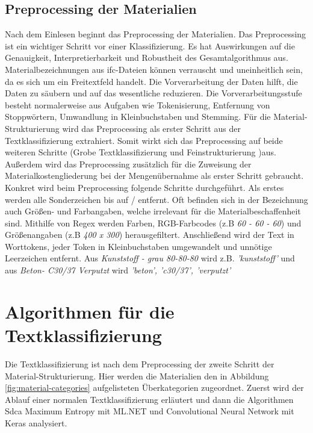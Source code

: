 \subsection{Preprocessing der Materialien}
\label{c:conception:architecture:preprocessing}
Nach dem Einlesen beginnt das Preprocessing der Materialien.
Das Preprocessing ist ein wichtiger Schritt vor einer Klassifizierung. Es hat Auswirkungen auf die Genauigkeit, Interpretierbarkeit und Robustheit des Gesamtalgorithmus aus. \citep{Zelaya_2019} Materialbezeichnungen aus \ac{ifc}-Dateien können verrauscht und uneinheitlich sein, da es sich um ein Freitextfeld handelt. Die Vorverarbeitung der Daten hilft, die Daten zu säubern und auf das wesentliche reduzieren. \citep{Priyanga_2016}
Die Vorverarbeitungsstufe besteht normalerweise aus Aufgaben wie Tokenisierung, Entfernung von Stoppwörtern, Umwandlung in Kleinbuchstaben und Stemming. \citep{Uysal_2014}
Für die Material-Strukturierung wird das Preprocessing als erster Schritt aus der Textklassifizierung extrahiert. Somit wirkt sich das Preprocessing auf beide weiteren Schritte (Grobe Textklassifizierung und Feinstrukturierung )aus. Außerdem wird das Preprocessing zusätzlich für die Zuweisung der Materialkostengliederung bei der Mengenübernahme als erster Schritt gebraucht.
Konkret wird beim Preprocessing folgende Schritte durchgeführt. Als erstes werden alle Sonderzeichen bis auf \glqq /\grqq{} entfernt. Oft befinden sich in der Bezeichnung auch Größen- und Farbangaben, welche irrelevant für die Materialbeschaffenheit sind.
Mithilfe von Regex werden Farben, RGB-Farbcodes (z.B \textit{60 - 60 - 60}) und Größenangaben (z.B \textit{400 x 300}) herausgefiltert. Anschließend wird der Text in Worttokens, jeder Token in Kleinbuchstaben umgewandelt und unnötige Leerzeichen entfernt. Aus \textit{\glqq Kunststoff - grau 80-80-80\grqq{}} wird z.B. \textit{\glqq 'kunststoff'\grqq{}} und aus \textit{\glqq Beton- C30/37 Verputzt\grqq{}} wird \textit{\glqq 'beton', 'c30/37', 'verputzt'\grqq{}}

\section{Algorithmen für die Textklassifizierung}
\label{c:conception:classification}
Die Textklassifizierung ist nach dem Preprocessing der zweite Schritt der Material-Strukturierung. Hier werden die Materialien den in Abbildung \ref{fig:material-categories} aufgelisteten Überkategorien zugeordnet. Zuerst wird der Ablauf einer normalen Textklassifizierung erläutert und dann die Algorithmen Sdca Maximum Entropy mit ML.NET und Convolutional Neural Network mit Keras analysiert.

